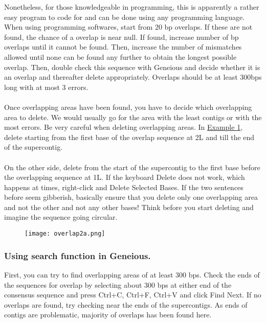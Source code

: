 \documentclass[11pt]{article}
\newcommand{\exautoref}[1]{\hyperref[#1]{Example \ref*{#1}}}
\begin{document}
Nonetheless, for those knowledgeable in programming, this is apparently a rather easy program to code for and can be done using any programming language. When using programming softwares, start from 20 bp overlaps. If these are not found, the chance of a overlap is near null. If found, increase number of bp overlaps until it cannot be found. Then, increase the number of mismatches allowed until none can be found any further to obtain the longest possible overlap. Then, double check this sequence with Geneious and decide whether it is an overlap and thereafter delete appropriately. Overlaps should be at least 300bps long with at most 3 errors. 
\\
\\
Once overlapping areas have been found, you have to decide which overlapping area to delete. We would usually go for the area with the least contigs or with the most errors. Be very careful when deleting overlapping areas. In \exautoref{fig:overlap2a}, delete starting from the first base of the overlap sequence at 2L and till the end of the supercontig. 
\\
\\
On the other side, delete from the start of the supercontig to the first base before the overlapping sequence at 1L. If the keyboard Delete does not work, which happens at times, right-click and Delete Selected Bases. If the two sentences before seem gibberish, basically ensure that you delete only one overlapping area and not the other and not any other bases! Think before you start deleting and imagine the sequence going circular. 

\begin{figure}[H]
  \centering
    \texttt{[image: overlap2a.png]}
  \label{fig:overlap2a}
\end{figure}

\subsubsection{Using search function in Geneious.}
First, you can try to find overlapping areas of at least 300 bps. Check the ends of the sequences for overlap by selecting about 300 bps at either end of the consensus sequence and press Ctrl+C, Ctrl+F, Ctrl+V and click Find Next. If no overlaps are found, try checking near the ends of the supercontigs. As ends of contigs are problematic, majority of overlaps has been found here. 
\end{document}
